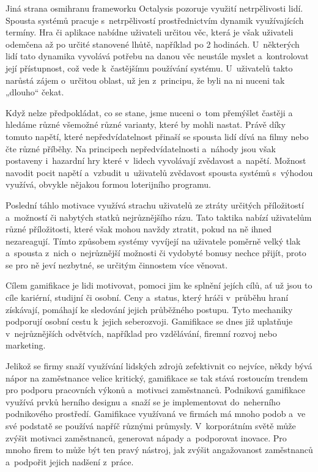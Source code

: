 \documentclass[12pt]{article}
\begin{document}
Jiná strana osmihranu frameworku Octalysis pozoruje využití
netrpělivosti lidí. Spousta systémů pracuje s~netrpělivostí
prostřednictvím dynamik využívajících termíny. 
Hra či aplikace nabídne uživateli určitou věc, která je však uživateli 
odemčena až po určité stanovené lhůtě, například po 2 hodinách.
U~některých lidí tato dynamika vyvolává potřebu na danou věc neustále myslet
a~kontrolovat její přístupnost, což vede k~častějšímu používání systému.
U~uživatelů takto narůstá zájem o~určitou oblast, už jen z~principu,
že byli na ni nuceni tak „dlouho“ čekat.

Když nelze předpokládat, co se stane, jsme nuceni o~tom přemýšlet častěji a~
hledáme různé všemožné různé varianty, které by mohli nastat.
Právě díky tomuto napětí, které nepředvídatelnost přinaší se spousta lidí 
dívá na filmy nebo čte různé příběhy. 
Na principech nepředvídatelnosti a~náhody jsou však postaveny i~hazardní hry
které v~lidech vyvolávají zvědavost a~napětí.
Možnost navodit pocit napětí a~vzbudit u~uživatelů zvědavost spousta systémů
s~výhodou využívá, obvykle nějakou formou loterijního programu.

Poslední táhlo motivace využívá strachu uživatelů ze ztráty určitých příložitostí 
a~možností či nabytých statků nejrůznějšího rázu. 
Tato taktika nabízí uživatelům různé příložitosti, které však mohou navždy ztratit,
pokud na ně ihned nezareagují. 
Tímto způsobem systémy vyvíjejí na uživatele poměrně velký tlak
a~spousta z~nich o~nejrůznější možnosti či vydobyté bonusy nechce přijít,
proto se pro ně jeví nezbytné, se určitým činnostem více věnovat.


Cílem gamifikace je lidi motivovat, 
pomoci jim ke splnění jejích cílů, ať už jsou to cíle kariérní, studijní či osobní.
Ceny a~status, který hráči v~průběhu hraní získávají,
pomáhají ke sledování jejich průběžného postupu.
Tyto mechaniky podporují osobní cestu k~jejich seberozvoji. 
Gamifikace se dnes již uplatňuje v~nejrůznějších odvětvích,
například pro vzdělávání, firemní rozvoj nebo marketing.



Jelikož se firmy snaží využívání lidských zdrojů zefektivnit co nejvíce, 
někdy bývá nápor na zaměstnance velice kritický,
gamifikace se tak stává rostoucím trendem pro podporu pracovních výkonů
a~motivaci zaměstnanců.
Podniková gamifikace využívá prvků herního designu a~snaží se
je implementovat do~neherního podnikového prostředí. 
Gamifikace využívaná ve firmách
má mnoho podob a~ve své podstatě se používá napříč různými průmysly. 
V~korporátním světě může zvýšit motivaci zaměstnanců, generovat nápady a~podporovat inovace. 
Pro mnoho firem to může být ten pravý nástroj, jak zvýšit angažovanost zaměstnanců
a~podpořit jejich nadšení z~práce. 
\end{document}
